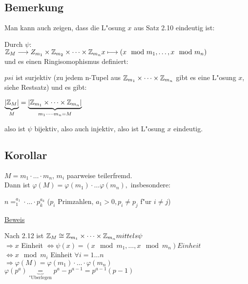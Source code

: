 \subsection{Bemerkung}
Man kann auch zeigen, dass die L"osung $x$ aus Satz 2.10 eindeutig ist:

Durch $\psi$: \\$\mathbb{Z} _M \longrightarrow Z_{m_1} \times \mathbb{Z}_{m_2} \times \dots \times \mathbb{Z}_{m_n}\\
x \longmapsto (x \mod{m_1}, \dots, x \mod{m_n})$\\
und es einen Ringisomophismus definiert:

$psi$ ist surjektiv (zu jedem n-Tupel aus $\mathbb{Z}_{m_1}\times \dots \times \mathbb{Z}_{m_n}$ gibt es eine L"osung $x$, siehe Restsatz) und es gibt:

$\underbrace{|\mathbb{Z}_M|}_{M}=\underbrace{|\mathbb{Z}_{m_1}\times \dots \times \mathbb{Z}_{m_n}|}_{m_1\cdot \dots \cdot m_n = M}$

also ist $\psi$ bijektiv, also auch injektiv, also ist L"osung $x$ eindeutig.

\subsection[Korollar: Phi-Funktion berechnen]{Korollar}
$M=m_1\cdot \dots \cdot m_n$, $m_i$ paarweise teilerfremd.\\
Dann ist $\varphi(M)=\varphi(m_1)\cdot \dots \varphi(m_n),$ insbesondere:

$n=^{a_1}_1 \cdot \dots \cdot p^{a_k}_k$ ($p_i$ Primzahlen, $a_1>0, p_i \neq p_j$ f"ur $i\neq j$)

\underline{Beweis}

Nach 2.12 ist $\mathbb{Z}_M \cong \mathbb{Z}_{m_1} \times \dots \times \mathbb{Z}_{m_n} mittels \psi$\\
$\Rightarrow x$ Einheit $\Leftrightarrow \psi(x) = ( x\mod{m_1}, \dots, x \mod{m_n}) Einheit$
\\ $\Leftrightarrow x \mod{m_i}$ Einheit $\forall i = 1 \dots n$\\
$\Rightarrow \varphi(M) = \varphi(m_1) \cdot \dots \cdot \varphi(m_n)$\\
$\varphi(p^a)\underbrace{=}_{\text{"Uberlegen}}p^a - p^{a-1} = p^{a-1}(p-1)$

